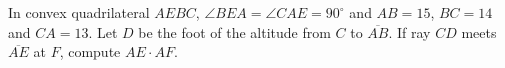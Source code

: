 In convex quadrilateral $AEBC$, $\angle BEA = \angle CAE = 90^{\circ}$ and $AB = 15$, $BC = 14$ and $CA = 13$.  Let $D$ be the foot of the altitude from $C$ to $\overline{AB}$.  If ray $CD$ meets $\overline{AE}$ at $F$, compute $AE \cdot AF$.
